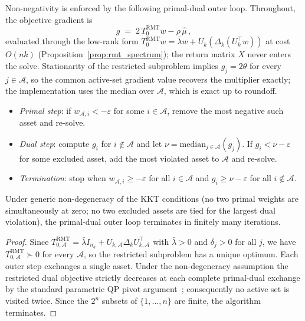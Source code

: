 Non-negativity is enforced by the following primal-dual outer loop. Throughout,
the objective gradient is
\[
  g \;=\; 2\,T_0^{\mathrm{RMT}} w - \rho\,\hat\mu\,,
\]
evaluated through the low-rank form
$T_0^{\mathrm{RMT}}w = \bar\lambda w + U_k(\Delta_k(U_k^\top w))$ at cost
$O(nk)$ (Proposition~\ref{prop:rmt_spectrum}); the return matrix $X$ never
enters the solve. Stationarity of the restricted subproblem implies
$g_j = 2\theta$ for every $j \in \mathcal{A}$, so the common active-set
gradient value recovers the multiplier exactly; the implementation uses the
median over $\mathcal{A}$, which is exact up to roundoff.

\begin{itemize}
  \item \emph{Primal step}: if $w_{\mathcal{A},i} < -\varepsilon$ for some
        $i \in \mathcal{A}$, remove the most negative such asset and re-solve.
  \item \emph{Dual step}: compute $g_i$ for $i \notin \mathcal{A}$ and let
        $\nu = \mathrm{median}_{j \in \mathcal{A}}(g_j)$.
        If $g_i < \nu - \varepsilon$ for some excluded asset, add the most
        violated asset to $\mathcal{A}$ and re-solve.
  \item \emph{Termination}: stop when $w_{\mathcal{A},i} \geq -\varepsilon$ for all
        $i \in \mathcal{A}$ and $g_i \geq \nu - \varepsilon$ for all
        $i \notin \mathcal{A}$.
\end{itemize}

\begin{proposition}\label{prop:termination}
Under generic non-degeneracy of the KKT conditions (no two primal weights are
simultaneously at zero; no two excluded assets are tied for the largest dual
violation), the primal-dual outer loop terminates in finitely many iterations.
\end{proposition}

\begin{proof}
Since $T_{0,\mathcal{A}}^{\mathrm{RMT}} = \bar\lambda I_{n_a} + U_{k,\mathcal{A}}\Delta_k U_{k,\mathcal{A}}^\top$
with $\bar\lambda > 0$ and $\delta_j > 0$ for all $j$, we have
$T_{0,\mathcal{A}}^{\mathrm{RMT}} \succ 0$ for every $\mathcal{A}$, so the
restricted subproblem has a unique optimum. Each outer step exchanges a single
asset. Under the non-degeneracy assumption the restricted dual objective
strictly decreases at each complete primal-dual exchange by the standard
parametric QP pivot argument~\cite{nocedal2006}; consequently no active set is
visited twice. Since the $2^n$ subsets of $\{1,\ldots,n\}$ are finite, the
algorithm terminates.
\end{proof}

